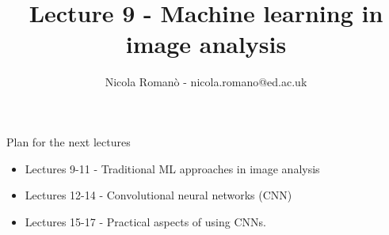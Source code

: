 \documentclass[9pt, aspectratio=169]{beamer}
\author{Nicola Roman\`o - nicola.romano@ed.ac.uk}
\title{Lecture 9 - Machine learning in image analysis}
\date{}
\begin{document}

\begin{frame}
    \titlepage
\end{frame}

\begin{frame}
    {Plan for the next lectures}
    \begin{itemize}
        \item Lectures 9-11 - Traditional ML approaches in image analysis
        \item Lectures 12-14 - Convolutional neural networks (CNN)
        \item Lectures 15-17 - Practical aspects of using CNNs.
    \end{itemize}
\end{frame}
\end{document}
